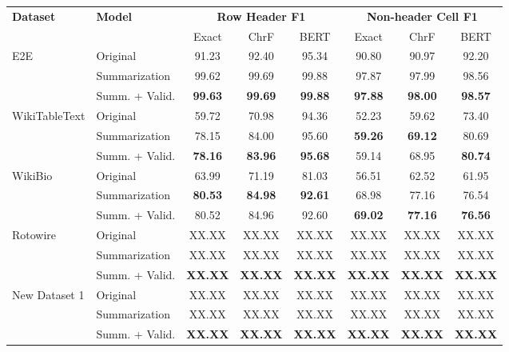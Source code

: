 \documentclass[12pt,a4paper]{article}
\begin{document}
\begin{table}[h]
    \centering
    \begin{tabular}{llccc|ccc}
        \toprule
        \textbf{Dataset} & \textbf{Model} & \multicolumn{3}{c}{\textbf{Row Header F1}} & \multicolumn{3}{c}{\textbf{Non-header Cell F1}} \\
        \cmidrule(lr){3-5} \cmidrule(lr){6-8}
         & & Exact & ChrF & BERT & Exact & ChrF & BERT \\
        \midrule
        \multirow{3}{*}{E2E} 
        & Original & 91.23 & 92.40 & 95.34 & 90.80 & 90.97 & 92.20 \\
        & Summarization & 99.62 & 99.69 & 99.88 & 97.87 & 97.99 & 98.56 \\
        & Summ. + Valid. & \textbf{99.63} & \textbf{99.69} & \textbf{99.88} & \textbf{97.88} & \textbf{98.00} & \textbf{98.57} \\
        \midrule
        \multirow{3}{*}{WikiTableText} 
        & Original & 59.72 & 70.98 & 94.36 & 52.23 & 59.62 & 73.40 \\
        & Summarization & 78.15 & 84.00 & 95.60 & \textbf{59.26} & \textbf{69.12} & 80.69 \\
        & Summ. + Valid. & \textbf{78.16} & \textbf{83.96} & \textbf{95.68} & 59.14 & 68.95 & \textbf{80.74} \\
        \midrule
        \multirow{3}{*}{WikiBio} 
        & Original & 63.99 & 71.19 & 81.03 & 56.51 & 62.52 & 61.95 \\
        & Summarization & \textbf{80.53} & \textbf{84.98} & \textbf{92.61} & 68.98 & 77.16 & 76.54 \\
        & Summ. + Valid. & 80.52 & 84.96 & 92.60 & \textbf{69.02} & \textbf{77.16} & \textbf{76.56} \\
        \midrule
        \multirow{3}{*}{Rotowire} 
        & Original & XX.XX & XX.XX & XX.XX & XX.XX & XX.XX & XX.XX \\
        & Summarization & XX.XX & XX.XX & XX.XX & XX.XX & XX.XX & XX.XX \\
        & Summ. + Valid. & \textbf{XX.XX} & \textbf{XX.XX} & \textbf{XX.XX} & \textbf{XX.XX} & \textbf{XX.XX} & \textbf{XX.XX} \\
        \midrule
        \multirow{3}{*}{New Dataset 1} 
        & Original & XX.XX & XX.XX & XX.XX & XX.XX & XX.XX & XX.XX \\
        & Summarization & XX.XX & XX.XX & XX.XX & XX.XX & XX.XX & XX.XX \\
        & Summ. + Valid. & \textbf{XX.XX} & \textbf{XX.XX} & \textbf{XX.XX} & \textbf{XX.XX} & \textbf{XX.XX} & \textbf{XX.XX} \\

\end{tabular}
\end{table}
\end{document}
